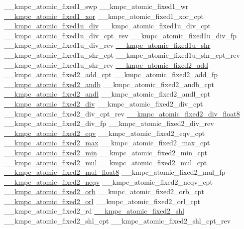 \begin{DoxyCode}
\_\_kmpc\_atomic\_fixed1\_swp
\_\_kmpc\_atomic\_fixed1\_wr
\hyperlink{kmp__atomic_8h_ab69e9a4da2388f5bcde98fc33431b1cb}{\_\_kmpc\_atomic\_fixed1\_xor}
\_\_kmpc\_atomic\_fixed1\_xor\_cpt
\hyperlink{kmp__atomic_8h_ae42139bdc5ff48a8baebf15b79e6085d}{\_\_kmpc\_atomic\_fixed1u\_div}
\_\_kmpc\_atomic\_fixed1u\_div\_cpt
\_\_kmpc\_atomic\_fixed1u\_div\_cpt\_rev
\_\_kmpc\_atomic\_fixed1u\_div\_fp
\_\_kmpc\_atomic\_fixed1u\_div\_rev
\hyperlink{kmp__atomic_8h_a27a54184b3c961c53c3ec582fae6ecda}{\_\_kmpc\_atomic\_fixed1u\_shr}
\_\_kmpc\_atomic\_fixed1u\_shr\_cpt
\_\_kmpc\_atomic\_fixed1u\_shr\_cpt\_rev
\_\_kmpc\_atomic\_fixed1u\_shr\_rev
\hyperlink{kmp__atomic_8h_a8922a9c7fb8b0684741b633adba11eb0}{\_\_kmpc\_atomic\_fixed2\_add}
\_\_kmpc\_atomic\_fixed2\_add\_cpt
\_\_kmpc\_atomic\_fixed2\_add\_fp
\hyperlink{kmp__atomic_8h_ae8b650c32279fbd16de9f49ce71a4339}{\_\_kmpc\_atomic\_fixed2\_andb}
\_\_kmpc\_atomic\_fixed2\_andb\_cpt
\hyperlink{kmp__atomic_8h_a7017f5946a18b163d9292d45e33c3d90}{\_\_kmpc\_atomic\_fixed2\_andl}
\_\_kmpc\_atomic\_fixed2\_andl\_cpt
\hyperlink{kmp__atomic_8h_ae2603ed2b5dd46b4412e4339ef8be8e8}{\_\_kmpc\_atomic\_fixed2\_div}
\_\_kmpc\_atomic\_fixed2\_div\_cpt
\_\_kmpc\_atomic\_fixed2\_div\_cpt\_rev
\hyperlink{kmp__atomic_8h_a37fb2522ebc4076453e37c6f35f99ace}{\_\_kmpc\_atomic\_fixed2\_div\_float8}
\_\_kmpc\_atomic\_fixed2\_div\_fp
\_\_kmpc\_atomic\_fixed2\_div\_rev
\hyperlink{kmp__atomic_8h_ac8a265db8602aa1f49cf7ef07fa5b667}{\_\_kmpc\_atomic\_fixed2\_eqv}
\_\_kmpc\_atomic\_fixed2\_eqv\_cpt
\hyperlink{kmp__atomic_8h_ad7f3d9ba4489f7d60569fb0e3720d90d}{\_\_kmpc\_atomic\_fixed2\_max}
\_\_kmpc\_atomic\_fixed2\_max\_cpt
\hyperlink{kmp__atomic_8h_a6681658a7fd2e1bc17692fb0b61e6175}{\_\_kmpc\_atomic\_fixed2\_min}
\_\_kmpc\_atomic\_fixed2\_min\_cpt
\hyperlink{kmp__atomic_8h_ad2ad655a2fc82c0d6a98e4103c822b80}{\_\_kmpc\_atomic\_fixed2\_mul}
\_\_kmpc\_atomic\_fixed2\_mul\_cpt
\hyperlink{kmp__atomic_8h_af6016b314f1b1dcc329cd6cada04116a}{\_\_kmpc\_atomic\_fixed2\_mul\_float8}
\_\_kmpc\_atomic\_fixed2\_mul\_fp
\hyperlink{kmp__atomic_8h_addb8ad0faa5d0bfc65fd70b1b049e657}{\_\_kmpc\_atomic\_fixed2\_neqv}
\_\_kmpc\_atomic\_fixed2\_neqv\_cpt
\hyperlink{kmp__atomic_8h_aa3890e69748eb405442ce3a859c18619}{\_\_kmpc\_atomic\_fixed2\_orb}
\_\_kmpc\_atomic\_fixed2\_orb\_cpt
\hyperlink{kmp__atomic_8h_a70f73269a0248db0b5f4bbdde5b501b5}{\_\_kmpc\_atomic\_fixed2\_orl}
\_\_kmpc\_atomic\_fixed2\_orl\_cpt
\_\_kmpc\_atomic\_fixed2\_rd
\hyperlink{kmp__atomic_8h_a3236d271fb109db4b1153b133c99c187}{\_\_kmpc\_atomic\_fixed2\_shl}
\_\_kmpc\_atomic\_fixed2\_shl\_cpt
\_\_kmpc\_atomic\_fixed2\_shl\_cpt\_rev

\end{DoxyCode}
